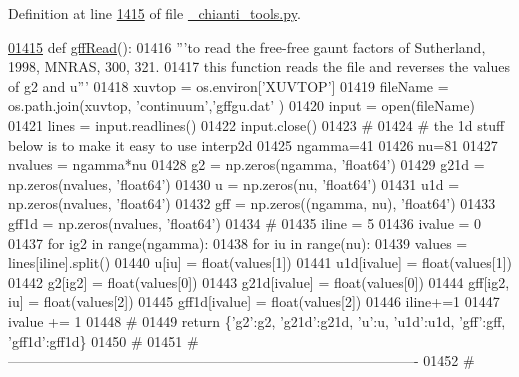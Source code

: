 Definition at line \hyperlink{__chianti__tools_8py_source_l01415}{1415} of file \hyperlink{__chianti__tools_8py_source}{\+\_\+chianti\+\_\+tools.\+py}.


\begin{DoxyCode}
\hypertarget{namespacepyneb_1_1utils_1_1__chianti__tools_l01415}{}\hyperlink{namespacepyneb_1_1utils_1_1__chianti__tools_af524b50fae5a347eff4976b7ce895ab1}{01415} \textcolor{keyword}{def }\hyperlink{namespacepyneb_1_1utils_1_1__chianti__tools_af524b50fae5a347eff4976b7ce895ab1}{gffRead}():
01416     \textcolor{stringliteral}{'''to read the free-free gaunt factors of Sutherland, 1998, MNRAS, 300, 321.}
01417 \textcolor{stringliteral}{    this function reads the file and reverses the values of g2 and u'''}
01418     xuvtop = os.environ[\textcolor{stringliteral}{'XUVTOP'}]
01419     fileName = os.path.join(xuvtop, \textcolor{stringliteral}{'continuum'},\textcolor{stringliteral}{'gffgu.dat'} )
01420     input = open(fileName)
01421     lines = input.readlines()
01422     input.close()
01423     \textcolor{comment}{#}
01424     \textcolor{comment}{#  the 1d stuff below is to make it easy to use interp2d}
01425     ngamma=41
01426     nu=81
01427     nvalues = ngamma*nu
01428     g2 = np.zeros(ngamma, \textcolor{stringliteral}{'float64'})
01429     g21d = np.zeros(nvalues, \textcolor{stringliteral}{'float64'})
01430     u = np.zeros(nu, \textcolor{stringliteral}{'float64'})
01431     u1d = np.zeros(nvalues, \textcolor{stringliteral}{'float64'})
01432     gff = np.zeros((ngamma, nu), \textcolor{stringliteral}{'float64'})
01433     gff1d = np.zeros(nvalues, \textcolor{stringliteral}{'float64'})
01434     \textcolor{comment}{#}
01435     iline = 5
01436     ivalue = 0
01437     \textcolor{keywordflow}{for} ig2 \textcolor{keywordflow}{in} range(ngamma):
01438         \textcolor{keywordflow}{for} iu \textcolor{keywordflow}{in} range(nu):
01439             values = lines[iline].split()
01440             u[iu] = float(values[1])
01441             u1d[ivalue] = float(values[1])
01442             g2[ig2] = float(values[0])
01443             g21d[ivalue] = float(values[0])
01444             gff[ig2, iu] = float(values[2])
01445             gff1d[ivalue] = float(values[2])
01446             iline+=1
01447             ivalue += 1
01448     \textcolor{comment}{#}
01449     \textcolor{keywordflow}{return} \{\textcolor{stringliteral}{'g2'}:g2, \textcolor{stringliteral}{'g21d'}:g21d,  \textcolor{stringliteral}{'}\textcolor{stringliteral}{u':u, '}u1d':u1d,  'gff':gff,  'gff1d':gff1d\}
01450     \textcolor{comment}{#}
01451     \textcolor{comment}{# ----------------------------------------------------------------------------------------}
01452     \textcolor{comment}{#}
\end{DoxyCode}
\hypertarget{namespacepyneb_1_1utils_1_1__chianti__tools_ad4bc7b577fd4c3819ceb00b0a444351b}{}
